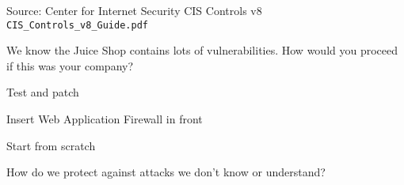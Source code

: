\documentclass[Screen16to9,17pt]{foils}
\begin{document}
Source: Center for Internet Security CIS Controls v8 \verb+CIS_Controls_v8_Guide.pdf+






We know the Juice Shop contains lots of vulnerabilities. How would you proceed if this was your company?


\begin{list2}
\item Test and patch
\item Insert Web Application Firewall in front
\item Start from scratch
\end{list2}

How do we protect against attacks we don't know or understand?


\slidenext{}
\end{document}
